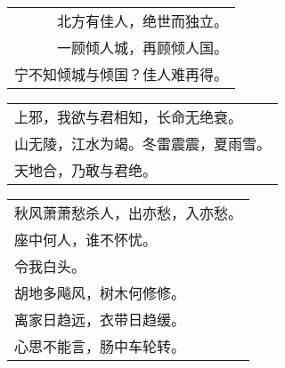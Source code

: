 \nopagebreak%
\nopagebreak%
\noindent\begin{minipage}{\linewidth}
  \vskip-3pt\begin{table}[H]
    \centering
    \begin{tabular}{@{}l@{}}
　　　北方有佳人，绝世而独立。\\
　　　一顾倾人城，再顾倾人国。\\
宁不知倾城与倾国？佳人难再得。
    \end{tabular}
  \end{table}
\end{minipage}
\vspace{1cm}


\nopagebreak%
\nopagebreak%
\noindent\begin{minipage}{\linewidth}
  \vskip-3pt\begin{table}[H]
    \centering
    \begin{tabular}{@{}l@{}}
上邪，我欲与君相知，长命无绝衰。\\
山无陵，江水为竭。冬雷震震，夏雨雪。\\
天地合，乃敢与君绝。
    \end{tabular}
  \end{table}
\end{minipage}
\vspace{1cm}


\nopagebreak%
\nopagebreak%
\noindent\begin{minipage}{\linewidth}
  \vskip-3pt\begin{table}[H]
    \centering
    \begin{tabular}{@{}l@{}}
秋风萧萧愁杀人，出亦愁，入亦愁。\\
座中何人，谁不怀忧。\\
令我白头。\\
胡地多飚风，树木何修修。\\
离家日趋远，衣带日趋缓。\\
心思不能言，肠中车轮转。
    \end{tabular}
  \end{table}
\end{minipage}
\vspace{1cm}


